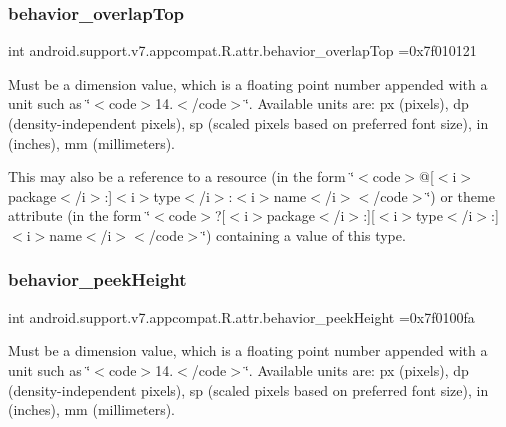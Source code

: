 \subsubsection{\texorpdfstring{behavior\+\_\+overlap\+Top}{behavior\_overlapTop}}
{\footnotesize\ttfamily int android.\+support.\+v7.\+appcompat.\+R.\+attr.\+behavior\+\_\+overlap\+Top =0x7f010121\hspace{0.3cm}{\ttfamily [static]}}

Must be a dimension value, which is a floating point number appended with a unit such as \char`\"{}$<$code$>$14.\+5sp$<$/code$>$\char`\"{}. Available units are\+: px (pixels), dp (density-\/independent pixels), sp (scaled pixels based on preferred font size), in (inches), mm (millimeters). 

This may also be a reference to a resource (in the form \char`\"{}$<$code$>$@\mbox{[}$<$i$>$package$<$/i$>$\+:\mbox{]}$<$i$>$type$<$/i$>$\+:$<$i$>$name$<$/i$>$$<$/code$>$\char`\"{}) or theme attribute (in the form \char`\"{}$<$code$>$?\mbox{[}$<$i$>$package$<$/i$>$\+:\mbox{]}\mbox{[}$<$i$>$type$<$/i$>$\+:\mbox{]}$<$i$>$name$<$/i$>$$<$/code$>$\char`\"{}) containing a value of this type. \mbox{\label{classandroid_1_1support_1_1v7_1_1appcompat_1_1R_1_1attr_a6efba039d772590549dfeaf0b0eeae12}} 
\subsubsection{\texorpdfstring{behavior\+\_\+peek\+Height}{behavior\_peekHeight}}
{\footnotesize\ttfamily int android.\+support.\+v7.\+appcompat.\+R.\+attr.\+behavior\+\_\+peek\+Height =0x7f0100fa\hspace{0.3cm}{\ttfamily [static]}}

Must be a dimension value, which is a floating point number appended with a unit such as \char`\"{}$<$code$>$14.\+5sp$<$/code$>$\char`\"{}. Available units are\+: px (pixels), dp (density-\/independent pixels), sp (scaled pixels based on preferred font size), in (inches), mm (millimeters). 

